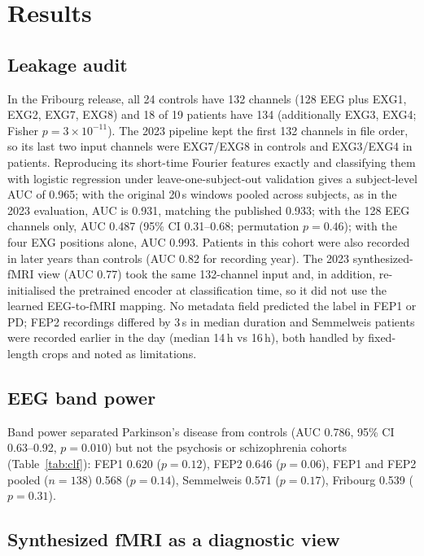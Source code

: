 \documentclass[11pt]{article}
\begin{document}
\section{Results}

\subsection{Leakage audit}\label{sec:res_leak}
In the Fribourg release, all 24 controls have 132 channels (128 EEG plus EXG1, EXG2, EXG7, EXG8) and 18 of 19 patients have 134 (additionally EXG3, EXG4; Fisher $p=3\times10^{-11}$).
The 2023 pipeline \citep{calhas2023medrxiv} kept the first 132 channels in file order, so its last two input channels were EXG7/EXG8 in controls and EXG3/EXG4 in patients.
Reproducing its short-time Fourier features exactly and classifying them with logistic regression under leave-one-subject-out validation gives a subject-level AUC of 0.965; with the original 20\,s windows pooled across subjects, as in the 2023 evaluation, AUC is 0.931, matching the published 0.933; with the 128 EEG channels only, AUC 0.487 (95\% CI 0.31--0.68; permutation $p=0.46$); with the four EXG positions alone, AUC 0.993.
Patients in this cohort were also recorded in later years than controls (AUC 0.82 for recording year).
The 2023 synthesized-fMRI view (AUC 0.77) took the same 132-channel input and, in addition, re-initialised the pretrained encoder at classification time, so it did not use the learned EEG-to-fMRI mapping.
No metadata field predicted the label in FEP1 or PD; FEP2 recordings differed by 3\,s in median duration and Semmelweis patients were recorded earlier in the day (median 14\,h vs 16\,h), both handled by fixed-length crops and noted as limitations.

\subsection{EEG band power}\label{sec:res_eeg}
Band power separated Parkinson's disease from controls (AUC 0.786, 95\% CI 0.63--0.92, $p=0.010$) but not the psychosis or schizophrenia cohorts (Table~\ref{tab:clf}): FEP1 0.620 ($p=0.12$), FEP2 0.646 ($p=0.06$), FEP1 and FEP2 pooled ($n=138$) 0.568 ($p=0.14$), Semmelweis 0.571 ($p=0.17$), Fribourg 0.539 ($p=0.31$).

\subsection{Synthesized fMRI as a diagnostic view}\label{sec:res_synth}
\end{document}
